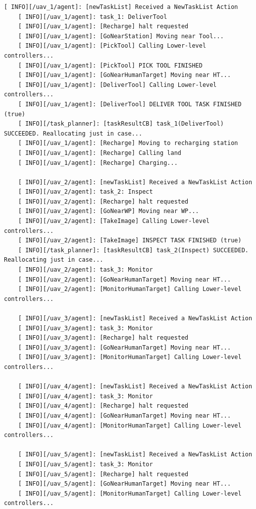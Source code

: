 \begin{lstlisting}[caption={Feedback messages printed by the \emph{Agent Behaviour Managers} during the plan execution}, breaklines=true, label=exit:ExecutionFirstPlan]
    [ INFO][/uav_1/agent]: [newTaskList] Received a NewTaskList Action
    [ INFO][/uav_1/agent]: task_1: DeliverTool
    [ INFO][/uav_1/agent]: [Recharge] halt requested
    [ INFO][/uav_1/agent]: [GoNearStation] Moving near Tool...
    [ INFO][/uav_1/agent]: [PickTool] Calling Lower-level controllers...
    [ INFO][/uav_1/agent]: [PickTool] PICK TOOL FINISHED
    [ INFO][/uav_1/agent]: [GoNearHumanTarget] Moving near HT...
    [ INFO][/uav_1/agent]: [DeliverTool] Calling Lower-level controllers...
    [ INFO][/uav_1/agent]: [DeliverTool] DELIVER TOOL TASK FINISHED (true)
    [ INFO][/task_planner]: [taskResultCB] task_1(DeliverTool) SUCCEEDED. Reallocating just in case...
    [ INFO][/uav_1/agent]: [Recharge] Moving to recharging station
    [ INFO][/uav_1/agent]: [Recharge] Calling land
    [ INFO][/uav_1/agent]: [Recharge] Charging...
    
    [ INFO][/uav_2/agent]: [newTaskList] Received a NewTaskList Action
    [ INFO][/uav_2/agent]: task_2: Inspect
    [ INFO][/uav_2/agent]: [Recharge] halt requested
    [ INFO][/uav_2/agent]: [GoNearWP] Moving near WP...
    [ INFO][/uav_2/agent]: [TakeImage] Calling Lower-level controllers...
    [ INFO][/uav_2/agent]: [TakeImage] INSPECT TASK FINISHED (true)
    [ INFO][/task_planner]: [taskResultCB] task_2(Inspect) SUCCEEDED. Reallocating just in case...
    [ INFO][/uav_2/agent]: task_3: Monitor
    [ INFO][/uav_2/agent]: [GoNearHumanTarget] Moving near HT...
    [ INFO][/uav_2/agent]: [MonitorHumanTarget] Calling Lower-level controllers...
    
    [ INFO][/uav_3/agent]: [newTaskList] Received a NewTaskList Action
    [ INFO][/uav_3/agent]: task_3: Monitor
    [ INFO][/uav_3/agent]: [Recharge] halt requested
    [ INFO][/uav_3/agent]: [GoNearHumanTarget] Moving near HT...
    [ INFO][/uav_3/agent]: [MonitorHumanTarget] Calling Lower-level controllers...
    
    [ INFO][/uav_4/agent]: [newTaskList] Received a NewTaskList Action
    [ INFO][/uav_4/agent]: task_3: Monitor
    [ INFO][/uav_4/agent]: [Recharge] halt requested
    [ INFO][/uav_4/agent]: [GoNearHumanTarget] Moving near HT...
    [ INFO][/uav_4/agent]: [MonitorHumanTarget] Calling Lower-level controllers...
    
    [ INFO][/uav_5/agent]: [newTaskList] Received a NewTaskList Action
    [ INFO][/uav_5/agent]: task_3: Monitor
    [ INFO][/uav_5/agent]: [Recharge] halt requested
    [ INFO][/uav_5/agent]: [GoNearHumanTarget] Moving near HT...
    [ INFO][/uav_5/agent]: [MonitorHumanTarget] Calling Lower-level controllers...
\end{lstlisting}

